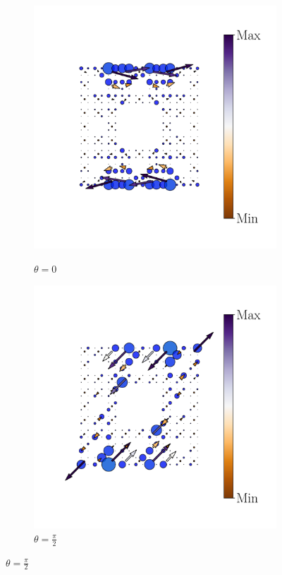 \begin{figure}[h!]
\begin{minipage}[h!]{1.1\textwidth}
\begin{subfigure}[b!]{0.2 \textwidth}
             \label{}
         \end{subfigure}\hspace*{-0.5em}
          \begin{subfigure}[b!]{0.2 \textwidth}
             \caption*{$\theta = 0$}
             \includegraphics[width=\textwidth]{Imagenes/Resultados_pump_Fractal/x/hoti_pomp_x_neg3.pdf}
             \label{}
         \end{subfigure}\hspace*{-0.5em}
          \begin{subfigure}[b!]{0.2 \textwidth}
             \caption*{$\theta = \frac{\pi}{2}$}
             \includegraphics[width=\textwidth]{Imagenes/Resultados_pump_Fractal/x/hoti_pomp_x_neg4.pdf}

\end{subfigure}
\end{minipage}
\end{figure}
